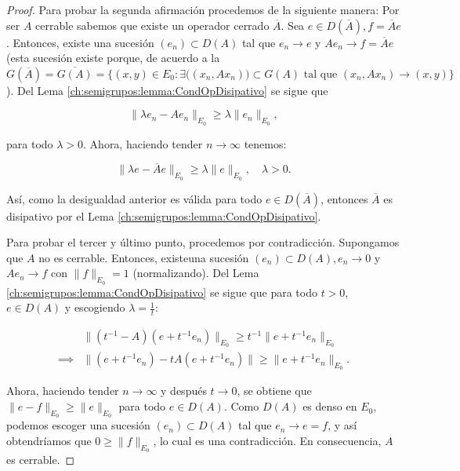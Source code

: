 \begin{proof}
    Para probar la segunda afirmación procedemos de la siguiente manera: Por ser $A$ cerrable sabemos que existe un operador cerrado $\overline{A}$. Sea $e \in D(\overline{A}), f = \overline{A}e$. Entonces, existe una sucesión $(e_n) \subset D(A)$ tal que $e_n \rightarrow e$ y $Ae_n \rightarrow f = \overline{A}e$ (esta sucesión existe porque, de acuerdo a la \cite[Cap.~VIII, \S 1]{reed-1980-met-mod-mat} $G(\overline{A}) = \overline{G(A)} = \{(x, y) \in E_0 : \exists \big((x_n, Ax_n)\big) \subset G(A) \text{ tal que } (x_n, Ax_n) \rightarrow (x, y)\}$). Del Lema \ref{ch:semigrupos:lemma:CondOpDisipativo} se sigue que

    \[\lVert \lambda e_n - Ae_n \rVert_{E_0} \geq \lambda \lVert e_n \rVert_{E_0},\]

    para todo $\lambda >0 $. Ahora, haciendo tender $n \rightarrow \infty$ tenemos:

    \[\lVert\lambda e - \overline{A}e \rVert_{E_0} \geq \lambda \lVert e \rVert_{E_0}, \quad \lambda > 0.\]

    Así, como la desigualdad anterior es válida para todo $e \in D(\overline{A})$, entonces $\overline{A}$ es disipativo por el Lema \ref{ch:semigrupos:lemma:CondOpDisipativo}.

    Para probar el tercer y último punto, procedemos por contradicción. Supongamos que $A$ no es cerrable. Entonces, existe\footnotemark una sucesión $(e_n) \subset D(A), e_n \rightarrow 0$ y $Ae_n \rightarrow f$ con $\lVert f \rVert_{E_0} = 1$ (normalizando). Del Lema \ref{ch:semigrupos:lemma:CondOpDisipativo} se sigue que para todo $t > 0$, $e \in D(A)$ y escogiendo $\lambda = \frac{1}{t}$:

    \begin{align*}
        &\lVert (t^{-1}-A)(e+t^{-1}e_n)\rVert_{E_0} \geq t^{-1}\lVert e+t^{-1}e_n \rVert_{E_0}\\
        \implies& \lVert (e+t^{-1}e_n) - tA(e+t^{-1}e_n) \rVert \geq \lVert e+t^{-1}e_n \rVert_{E_0}.
    \end{align*}

    Ahora, haciendo tender $n \rightarrow \infty$ y después $t \rightarrow 0$, se obtiene que $\lVert e - f \rVert_{E_0} \geq \lVert e \rVert_{E_0}$ para todo $e \in D(A)$. Como $D(A)$ es denso en $E_0$, podemos escoger una sucesión $(e_n) \subset D(A)$ tal que $e_n \rightarrow e = f$, y así obtendríamos que $0 \geq \lVert f\rVert_{E_0}$, lo cual es una contradicción. En consecuencia, $A$ es cerrable.
\end{proof}


